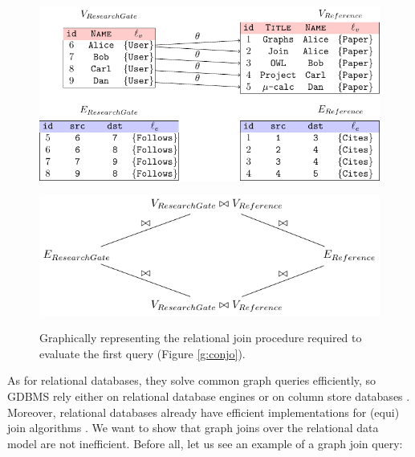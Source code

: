 \begin{figure}
	\begin{adjustbox}{max width=\textwidth}
		\begin{minipage}[b]{0.5\textwidth}
			\includegraphics[width=\textwidth]{fig/03joins/reljoins2}
			\label{key}
		\end{minipage}\quad
		\begin{minipage}[b]{0.5\textwidth}
			\includegraphics[width=\textwidth]{fig/03joins/queryplan3}
			\label{qplan}
		\end{minipage}
	\end{adjustbox}
	\caption{Graphically representing the relational join procedure required to evaluate the first query (Figure \ref{g:conjo}).}
\end{figure}
As for relational databases, they solve common graph queries efficiently, so GDBMS rely either on relational database engines
\cite{Aberger,Paradies,ErlingM09} or on column store databases \cite{SQLGraph,preSQLGraph}.
Moreover, relational databases already have  efficient implementations for (equi) join algorithms \cite{SchuhCD16}.
We want to show that  graph joins over the relational data model are
not inefficient.
Before all, let us see an example of a graph join query:

